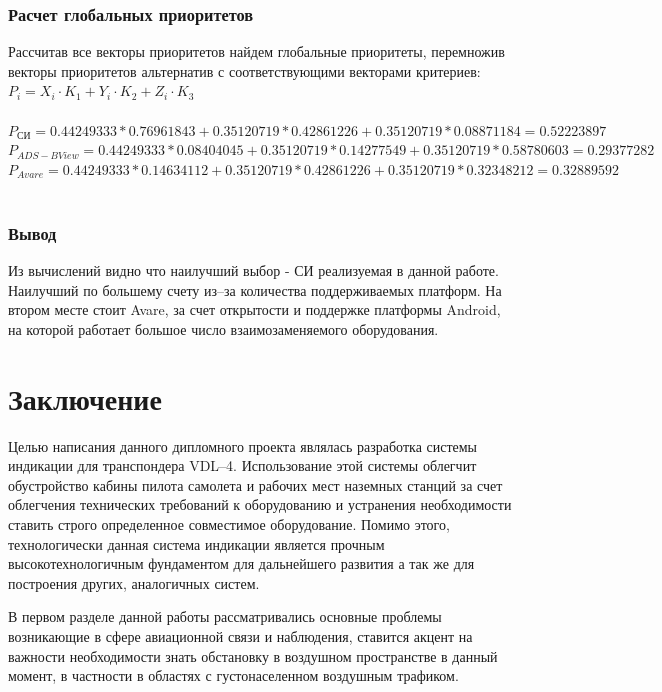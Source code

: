 \documentclass[a4paper,12pt]{report} %
\begin{document}
\subsection{Расчет глобальных приоритетов}

Рассчитав все векторы приоритетов найдем глобальные приоритеты, перемножив
векторы приоритетов альтернатив с соответствующими векторами критериев:\\

$P_i=X_i \cdot K_1 + Y_i \cdot K_2 + Z_i \cdot K_3 $ \\
\\
$P_{СИ} = 0.44249333 * 0.76961843 + 0.35120719 * 0.42861226 + 0.35120719 *
0.08871184 = 0.52223897$ \\
$P_{ADS-B View} = 0.44249333 * 0.08404045 + 0.35120719 * 0.14277549 + 0.35120719
* 0.58780603 = 0.29377282 $ \\
$P_{Avare} = 0.44249333 * 0.14634112 + 0.35120719 * 0.42861226 + 0.35120719 *
0.32348212 = 0.32889592$ \\
\\
\subsection{Вывод}

Из вычислений видно что наилучший выбор - СИ реализуемая в данной работе.
Наилучший по большему счету из--за количества поддерживаемых платформ. На втором
месте стоит Avare, за счет открытости и поддержке платформы Android, на которой
работает большое число взаимозаменяемого оборудования.

\newpage
\chapter*{Заключение}

Целью написания данного дипломного проекта являлась разработка системы индикации
для транспондера VDL--4. Использование этой системы облегчит обустройство кабины
пилота самолета и рабочих мест наземных станций за счет облегчения технических
требований к оборудованию и устранения необходимости ставить строго определенное
совместимое оборудование. Помимо этого, технологически данная система индикации
является прочным высокотехнологичным фундаментом для дальнейшего развития а так
же для построения других, аналогичных систем.

В первом разделе данной работы рассматривались основные проблемы возникающие в
сфере авиационной связи и наблюдения, ставится акцент на важности необходимости
знать обстановку в воздушном пространстве в данный момент, в частности в
областях с густонаселенном воздушным трафиком.
\end{document}
